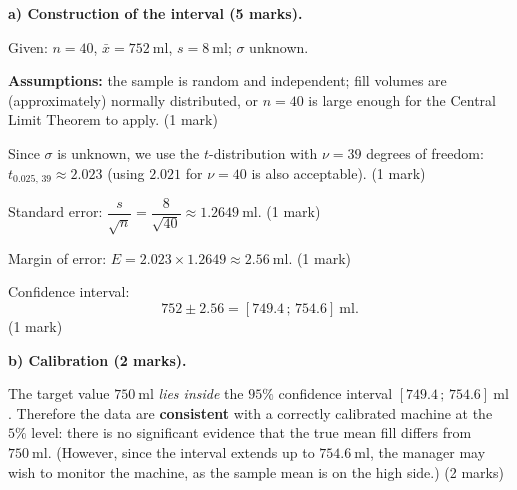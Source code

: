 \documentclass[11pt]{article}
\begin{document}
\begin{corrige}
\textbf{a) Construction of the interval (5 marks).}

Given: $n = 40$, $\bar{x} = 752\ \mathrm{ml}$, $s = 8\ \mathrm{ml}$; $\sigma$ unknown.

\textbf{Assumptions:} the sample is random and independent; fill volumes are (approximately) normally distributed, or $n = 40$ is large enough for the Central Limit Theorem to apply. \hfill (1 mark)

Since $\sigma$ is unknown, we use the $t$-distribution with $\nu = 39$ degrees of freedom: $t_{0.025,\,39} \approx 2.023$ (using $2.021$ for $\nu = 40$ is also acceptable). \hfill (1 mark)

Standard error: $\dfrac{s}{\sqrt{n}} = \dfrac{8}{\sqrt{40}} \approx 1.2649\ \mathrm{ml}$. \hfill (1 mark)

Margin of error: $E = 2.023 \times 1.2649 \approx 2.56\ \mathrm{ml}$. \hfill (1 mark)

Confidence interval:
\[ 752 \pm 2.56 = [749.4\,;\,754.6]\ \mathrm{ml}. \]
\hfill (1 mark)

\textbf{b) Calibration (2 marks).}

The target value $750\ \mathrm{ml}$ \emph{lies inside} the $95\%$ confidence interval $[749.4\,;\,754.6]\ \mathrm{ml}$. Therefore the data are \textbf{consistent} with a correctly calibrated machine at the $5\%$ level: there is no significant evidence that the true mean fill differs from $750\ \mathrm{ml}$. (However, since the interval extends up to $754.6\ \mathrm{ml}$, the manager may wish to monitor the machine, as the sample mean is on the high side.) \hfill (2 marks)


\end{corrige}
\end{document}
